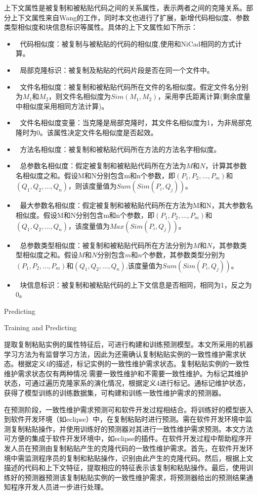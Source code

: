 上下文属性是被复制和被粘贴代码之间的关系属性，表示两者之间的克隆关系。部分上下文属性来自Wang的工作，同时本文也进行了扩展，新增代码相似度、参数类型相似度和块信息标识等属性。具体的上下文属性如下所示：
\begin{itemize}
\item 	代码相似度：被复制与被粘贴的代码的相似度,使用和NiCad相同的方式计算。
\item 	局部克隆标识：被复制及粘贴的代码片段是否在同一个文件中。
\item 	文件名相似度：被复制和被粘贴代码所在文件的名相似度。假定文件名分别为$M_1$和$M_2$，则文件名相似度为$Sim(M_1,M_2)$，采用李氏距离\cite{levenshtein1966binary}计算(剩余度量中相似度采用相同方法计算)。
\item 	文件名相似度变量：当克隆是局部克隆时，其文件名相似度为1，为非局部克隆时为0。该属性决定文件名相似度是否起效。
\item 	方法名相似度：被复制和被粘贴代码所在方法的方法名字相似度。
\item 	总参数名相似度：假定被复制和被粘贴代码所在方法为$M$和$N$，计算其参数名相似度之和。假设M和N分别包含m和n个参数，即$(P_1,P_2,…,P_m)$和$(Q_1,Q_2,…,Q_n)$，则该度量值为$Sum(Sim(P_i,Q_j))$。
\item 	最大参数名相似度：假定被复制和被粘贴代码所在方法为M和N，其大参数名相似度。假设M和N分别包含m和n个参数，即$(P_1,P_2,…,P_m)$和$(Q_1,Q_2,…,Q_n)$，该度量值为$Max(Sim(P_i,Q_j))$。
\item 	总参数类型相似度：被复制和被粘贴代码所在方法分别为$M$和$N$，其参数类型相似度之和。假设$M$和$N$分别包含$m$和$n$个参数，其参数类型分别为$(P_1,P_2,…,P_m)$和$(Q_1,Q_2,…,Q_n)$,该度量值为$Sum(Sim(P_i,Q_j))$。
\item 	块信息标识：被复制和被粘贴代码的上下文信息是否相同，相同为1，反之为0。
\end{itemize}

{Predicting}

{Training and Predicting}

提取复制粘贴实例的属性特征后，可进行构建和训练预测模型。本文所采用的机器学习方法为有监督学习方法，因此为还需确认复制粘贴实例的一致性维护需求状态。根据定义4的描述，标记实例的一致性维护需求状态。复制粘贴实例的一致性维护需求状态仅有两种情况:需要一致性维护和不需要一致性维护。为标记其维护状态，可通过遍历克隆家系的演化情况，根据定义4进行标记。通标记维护状态，获得了模型训练的训练数据集，可构建和训练一致性维护需求的预测器。


在预测阶段，一致性维护需求预测可和软件开发过程相结合。将训练好的模型嵌入到软件开发环境（如eclipse）中，在复制粘贴时进行预测。需在软件开发环境中监测复制粘贴操作，并使用训练好的预测器对其进行一致性维护需求预测。本文方法可方便的集成于软件开发环境中，如eclipse的插件。在软件开发过程中帮助程序开发人员在预测由复制粘贴产生的克隆代码的一致性维护需求。首先，在软件开发环境中需监测程序员的复制和粘贴操作，识别由此产生的克隆代码。然后，根据上文描述的代码和上下文特征，提取相应的特征表示该复制和粘贴操作。最后，使用训练好的预测器预测该复制粘贴实例的一致性维护需求，将预测器给出的预测结果通知程序开发人员进一步进行处理。

